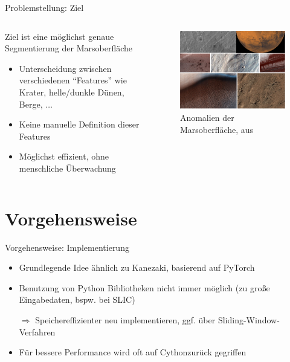 \documentclass[9pt]{beamer}
\begin{document}
\begin{frame}{Problemstellung: Ziel}
\begin{columns}
	\begin{column}{.4\textwidth}
		Ziel ist eine möglichst genaue Segmentierung der Marsoberfläche
		\begin{itemize}
			\item Unterscheidung zwischen verschiedenen \enquote{Features} wie Krater, helle/dunkle Dünen, Berge, $\ldots$
			\item Keine manuelle Definition dieser Features
			\item Möglichst effizient, ohne menschliche Überwachung
		\end{itemize}
	\end{column}
	\begin{column}{.6\textwidth}
		\begin{figure}[H]
			\includegraphics[width=\textwidth, keepaspectratio]{surface.png}
			\caption{Anomalien der Marsoberfläche, aus \footnotemark[1]}
		\end{figure}
	\end{column}
\end{columns}	
\end{frame}

\section{Vorgehensweise}

\begin{frame}{Vorgehensweise: Implementierung}
\begin{itemize}
	\item Grundlegende Idee ähnlich zu Kanezaki, basierend auf PyTorch
	\item Benutzung von Python Bibliotheken nicht immer möglich (zu große Eingabedaten, bspw. bei SLIC)
	\item[$\Rightarrow$] Speichereffizienter neu implementieren, ggf. über Sliding-Window-Verfahren
	\item Für bessere Performance wird oft auf Cython\footnotemark[1] zurück gegriffen
\end{itemize}
\end{frame}
\end{document}
